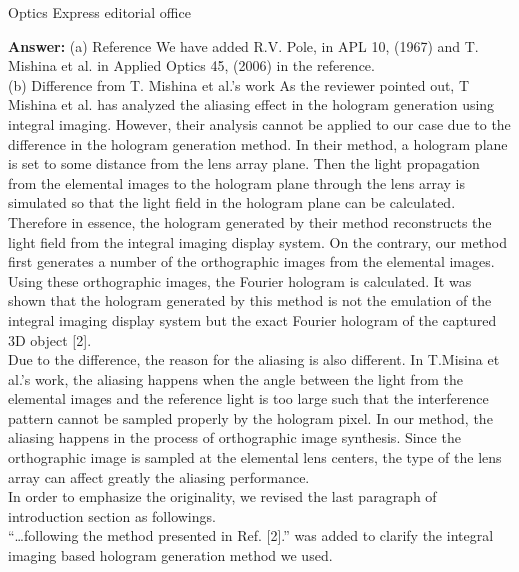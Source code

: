 \documentclass[a4paper,11pt]{letter}
\begin{document}
\begin{letter}{Optics Express editorial office}
\begin{enumerate}
\bigskip
\textbf{Answer:}
(a) Reference
We have added R.V. Pole, in APL 10, (1967) and T. Mishina et al. in Applied Optics 45, (2006) in the reference. \\

(b) Difference from T. Mishina et al.’s work
As the reviewer pointed out, T Mishina et al. has analyzed the aliasing effect in the hologram generation using integral imaging. However, their analysis cannot be applied to our case due to the difference in the hologram generation method. In their method, a hologram plane is set to some distance from the lens array plane. Then the light propagation from the elemental images to the hologram plane through the lens array is simulated so that the light field in the hologram plane can be calculated. Therefore in essence, the hologram generated by their method reconstructs the light field from the integral imaging display system. On the contrary, our method first generates a number of the orthographic images from the elemental images. Using these orthographic images, the Fourier hologram is calculated. It was shown that the hologram generated by this method is not the emulation of the integral imaging display system but the exact Fourier hologram of the captured 3D object [2]. \\

Due to the difference, the reason for the aliasing is also different. In T.Misina et al.’s work, the aliasing happens when the angle between the light from the elemental images and the reference light is too large such that the interference pattern cannot be sampled properly by the hologram pixel. In our method, the aliasing happens in the process of orthographic image synthesis. Since the orthographic image is sampled at the elemental lens centers, the type of the lens array can affect greatly the aliasing performance. \\

In order to emphasize the originality, we revised the last paragraph of introduction section as followings.\\
“…following the method presented in Ref. [2].” was added to clarify the integral imaging based hologram generation method we used.


\end{enumerate}
\end{letter}
\end{document}
